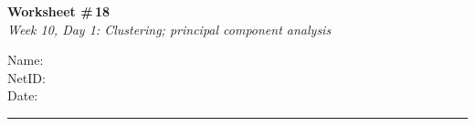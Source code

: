 \documentclass[11pt]{article}
\begin{document}
\noindent
\begin{minipage}[t]{0.55\textwidth}
  \vspace{0pt}
  {\LARGE \textbf{Worksheet \#\,18}} \\[0.3em]
  {\large \textit{Week 10, Day 1: Clustering; principal component analysis}}
\end{minipage}
\hfill
\begin{minipage}[t]{0.40\textwidth}
  \vspace{0pt}
  \begin{mdframed}[linecolor=black, linewidth=1pt, innertopmargin=10pt, innerbottommargin=10pt]
    \small
    \vspace{0.4cm}
    Name: \underline{\hspace{4.5cm}} \\[1em]
    NetID: \underline{\hspace{4.3cm}} \\[1em]
    Date: \underline{\hspace{4.4cm}} \\
  \end{mdframed}
\end{minipage}

\vspace{1em}
\noindent\rule{\linewidth}{1pt}
\vspace{0.2em}
\end{document}
